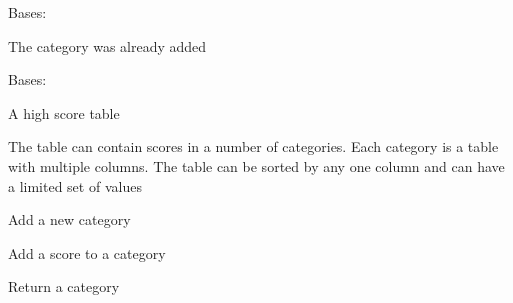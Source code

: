 \documentclass[letterpaper,10pt,english]{sphinxmanual}
\begin{document}

\begin{fulllineitems}
\label{blocks:serge.blocks.scores.DuplicateCategory}
Bases: 

The category was already added

\end{fulllineitems}


\begin{fulllineitems}
\label{blocks:serge.blocks.scores.HighScoreTable}
Bases: {\hyperref[common:serge.serialize.Serializable]{}}

A high score table

The table can contain scores in a number of categories. Each
category is a table with multiple columns. The table can be
sorted by any one column and can have a limited set of 
values

\begin{fulllineitems}
\label{blocks:serge.blocks.scores.HighScoreTable.addCategory}
Add a new category

\end{fulllineitems}


\begin{fulllineitems}
\label{blocks:serge.blocks.scores.HighScoreTable.addScore}
Add a score to a category

\end{fulllineitems}


\begin{fulllineitems}
\label{blocks:serge.blocks.scores.HighScoreTable.getCategory}
Return a category


\end{fulllineitems}
\end{fulllineitems}
\end{document}
